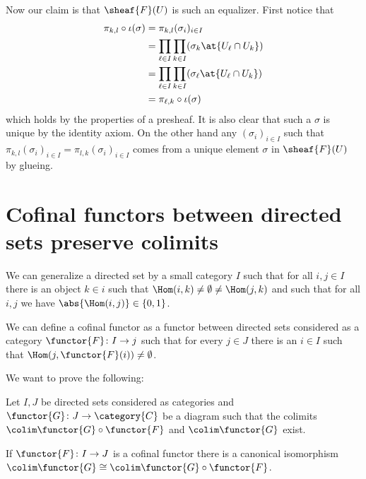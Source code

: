 Now our claim is that $\sheaf{F}(U)$ is such an equalizer. First
notice that
\begin{align*}
  \pi_{k,l}\circ \iota (\sigma) &= \pi_{k,l} (\sigma_i)_{i\in I} \\
                                &=\prod_{\ell \in I} \prod_{k\in
                                  I}(\sigma_k\at{U_\ell\cap U_k}) \\
                                &= \prod_{\ell \in I} \prod_{k\in
                                  I}(\sigma_\ell\at{U_\ell\cap U_k})\\
                                &= \pi_{\ell,k}\circ \iota (\sigma)
\end{align*}
which holds by the properties of a presheaf. It is also clear that
such a $\sigma$ is unique by the identity axiom. On the other hand any
$(\sigma_i)_{i\in I}$ such that $\pi_{k,l} (\sigma_i)_{i\in I} =
\pi_{l,k} (\sigma_i)_{i\in I}$ comes from a unique element $\sigma$ in
$\sheaf{F}(U)$ by glueing.

\section{Cofinal functors between directed sets preserve colimits}

We can generalize a directed set by a small category $I$ such that for
all $i,j\in I$ there is an object $k\in i$ such that $\Hom(i,k) \neq
\emptyset \neq \Hom(j,k)$ and such that for all $i,j$ we have $\abs{\Hom
(i,j)}\in \{0,1\}$.

We can define a cofinal functor as a functor between directed sets
considered as a category $\functor{F}\colon I\rightarrow j$ such that
for every $j\in J$ there is an $i\in I$ such that
$\Hom(j,\functor{F}(i))\neq \emptyset$.

We want to prove the following:

\begin{proposition}
  Let $I,J$ be directed sets considered as categories and
  $\functor{G}\colon J\rightarrow \category{C}$ be a diagram such that
  the colimits $\colim \functor{G}\circ \functor{F}$ and $\colim
  \functor{G}$ exist.

  If $\functor{F}\colon I\rightarrow J$ is a cofinal functor there is
  a canonical isomorphism $\colim \functor{G} \cong \colim \functor{G}
  \circ \functor{F}$.
\end{proposition}

